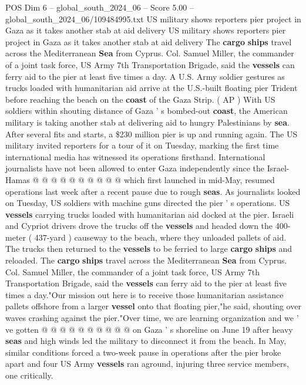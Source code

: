 \begin{textsample}{POS Dim 6 – global\_south\_2024\_06 – Score 5.00 – global\_south\_2024\_06/109484995.txt}  \label{ex:f6_pos_157}
US military shows reporters pier project in Gaza as it takes another stab at aid delivery US military shows reporters pier project in Gaza as it takes another stab at aid delivery The \textbf{cargo} \textbf{ships} travel across the Mediterranean \textbf{Sea} from Cyprus.
Col.
Samuel Miller, the commander of a joint task force, US Army 7th Transportation Brigade, said the \textbf{vessels} can ferry aid to the pier at least five times a day.
A U.S.
Army soldier gestures as trucks loaded with humanitarian aid arrive at the U.S.-built floating pier Trident before reaching the beach on the \textbf{coast} of the Gaza Strip. ( AP ) With US soldiers within shouting distance of Gaza ' s bombed-out \textbf{coast}, the American military is taking another stab at delivering aid to hungry Palestinians by \textbf{sea}.
After several fits and starts, a \$230 million pier is up and running again.
The US military invited reporters for a tour of it on Tuesday, marking the first time international media has witnessed its operations firsthand.
International journalists have not been allowed to enter Gaza independently since the Israel-Hamas @ @ @ @ @ @ @ @ @ @ which first launched in mid-May, resumed operations last week after a recent pause due to rough \textbf{seas}.
As journalists looked on Tuesday, US soldiers with machine guns directed the pier ' s operations.
US \textbf{vessels} carrying trucks loaded with humanitarian aid docked at the pier.
Israeli and Cypriot drivers drove the trucks off the \textbf{vessels} and headed down the 400-meter ( 437-yard ) causeway to the beach, where they unloaded pallets of aid.
The trucks then returned to the \textbf{vessels} to be ferried to large \textbf{cargo} \textbf{ships} and reloaded.
The \textbf{cargo} \textbf{ships} travel across the Mediterranean \textbf{Sea} from Cyprus.
Col.
Samuel Miller, the commander of a joint task force, US Army 7th Transportation Brigade, said the \textbf{vessels} can ferry aid to the pier at least five times a day."Our mission out here is to receive those humanitarian assistance pallets offshore from a larger \textbf{vessel} onto that floating pier,"he said, shouting over waves crashing against the pier."Over time, we are learning organization and we ' ve gotten @ @ @ @ @ @ @ @ @ @ on Gaza ' s shoreline on June 19 after heavy \textbf{seas} and high winds led the military to disconnect it from the beach.
In May, similar conditions forced a two-week pause in operations after the pier broke apart and four US Army \textbf{vessels} ran aground, injuring three service members, one critically.

\end{textsample}
